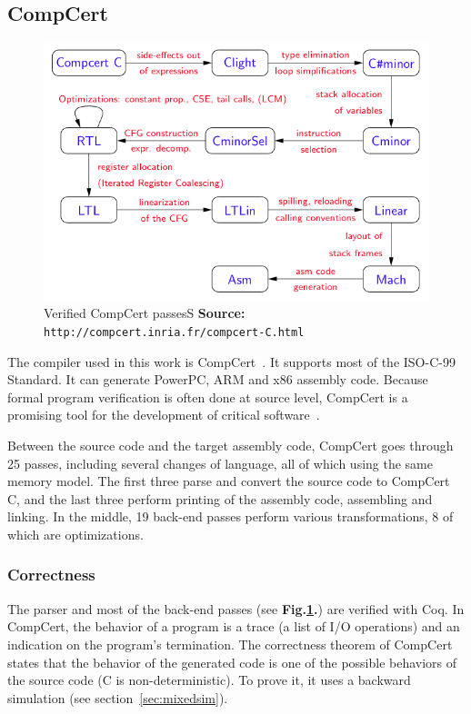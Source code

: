 \label{sec:prelim}
\subsection{CompCert}
\begin{figure}
\begin{center}
\includegraphics[scale=1]{img/passes.png}
\caption{Verified CompCert passes\hspace{\linewidth}S \textbf{Source: }\texttt{http://compcert.inria.fr/compcert-C.html}}
\label{fig:compcertpasses}
\end{center}
\end{figure}

The compiler used in this work is CompCert~\cite{compcertmanual}.
It supports most of the ISO-C-99 Standard.
It can generate PowerPC, ARM and x86 assembly code.
Because formal program verification is often done at source level, CompCert is a promising tool for the development of critical software~\cite{bedinfranca:hal-00653367}.

Between the source code and the target assembly code, CompCert goes through 25 passes, including several changes of language, all of which using the same memory model.
The first three parse and convert the source code to CompCert C, and the last three perform printing of the assembly code, assembling and linking.
In the middle, 19 back-end passes perform various transformations, 8 of which are optimizations.

\subsubsection{Correctness}
The parser and most of the back-end passes (see \textbf{Fig.\ref{fig:compcertpasses}.}) are verified with Coq.
In CompCert, the behavior of a program is a trace (a list of I/O operations) and an indication on the program's termination.
The correctness theorem of CompCert states that the behavior of the generated code is one of the possible behaviors of the source code (C is non-deterministic). To prove it, it uses a backward simulation (see section~\ref{sec:mixedsim}).

